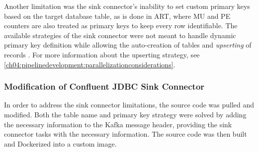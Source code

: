 Another limitation was the sink connector's inability to set custom primary keys based on the target database table, as is done in \ac{ART}, where MU and PE counters are also treated as primary keys to keep every row identifiable. The available strategies of the sink connector were not meant to handle dynamic primary key definition while allowing the auto-creation of tables and \textit{upserting} of records \cite{jdbcsinkdocumentation}. For more information about the upserting strategy, see \ref{ch04:pipelinedevelopment:parallelizationconsiderations}.

\subsubsection{Modification of Confluent JDBC Sink Connector}
In order to address the sink connector limitations, the source code was pulled and modified. Both the table name and primary key strategy were solved by adding the necessary information to the Kafka message header, providing the sink connector tasks with the necessary information. The source code was then built and Dockerized into a custom image.

